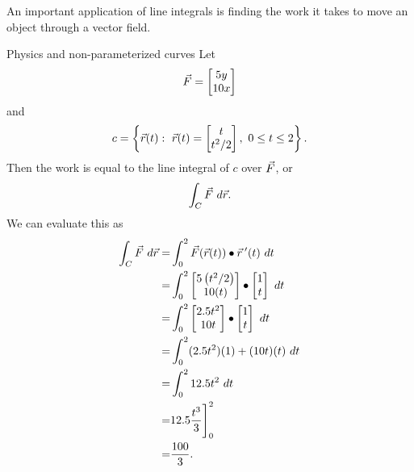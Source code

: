 An important application of line integrals is finding the work it takes to move an object through a vector field. 

\begin{example}{Physics and non-parameterized curves}
Let $$\vec{F}=\begin{bmatrix}5y\\10x\end{bmatrix}$$ and $$c=\left\{\vcr(t):\ \vcr(t)=\bmat{t\\ t^2/2},\ 0\leq t\leq 2 \right\}.$$
Then the work is equal to the line integral of $c$ over $\vec{F}$, or $$\int_C \vec{F} \ d\vec{r}. $$
We can evaluate this as 
\begin{align*}
\int_C\vec{F} \ d\vec{r}=&\int_0^2 \vec{F}(\vec{r}(t))\bullet\vec{r}\hspace{0.2em}'(t)\ dt \\
=&\int_0^2 \begin{bmatrix}5\left(t^2/2\right)\\10(t)\end{bmatrix}\bullet\begin{bmatrix}1\\t\end{bmatrix}\ dt\\
=&\int_0^2\begin{bmatrix}2.5t^2\\10t\end{bmatrix}\bullet\begin{bmatrix}1\\ t\end{bmatrix} \ dt\\
=&\int_0^2 (2.5t^2)(1)+(10t)(t)\ dt\\
=&\int_0^2 12.5t^2\ dt\\
=&12.5\frac{t^3}{3}\Bigg]_0^2\\
=&\frac{100}{3}.
\end{align*}

\end{example}